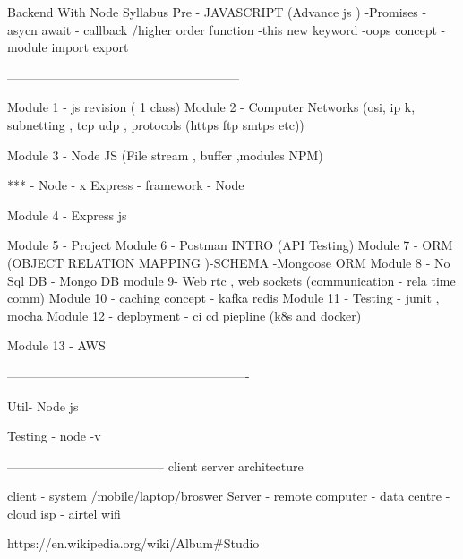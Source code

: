 Backend With Node 
Syllabus 
Pre -
JAVASCRIPT (Advance js )
-Promises 
- asycn await 
- callback /higher order function 
-this new keyword 
-oops concept 
-module import export 

--------------------------------------------------------

Module 1 - js revision ( 1 class)
Module 2 - Computer Networks (osi, ip k, subnetting , tcp udp , protocols (https ftp smtps etc))

Module 3 - Node JS (File stream , buffer ,modules NPM)

*** - Node - x
Express - framework - Node 

Module 4 - Express js 

Module 5 - Project 
Module 6 - Postman INTRO (API Testing)
Module 7 - ORM (OBJECT RELATION MAPPING )-SCHEMA -Mongoose ORM
Module 8 - No Sql DB - Mongo DB
module 9- Web rtc , web sockets (communication - rela time comm)
Module 10 - caching concept - kafka redis
Module 11 - Testing - junit , mocha 
Module 12 - deployment - ci cd piepline (k8s and docker)

Module 13 - AWS 

----------------------------------------------------------


Util- Node js 

Testing - node -v


--------------------------------------
client server architecture 

client - system /mobile/laptop/broswer
Server - remote computer - data centre - cloud 
isp - airtel wifi




https://en.wikipedia.org/wiki/Album#Studio